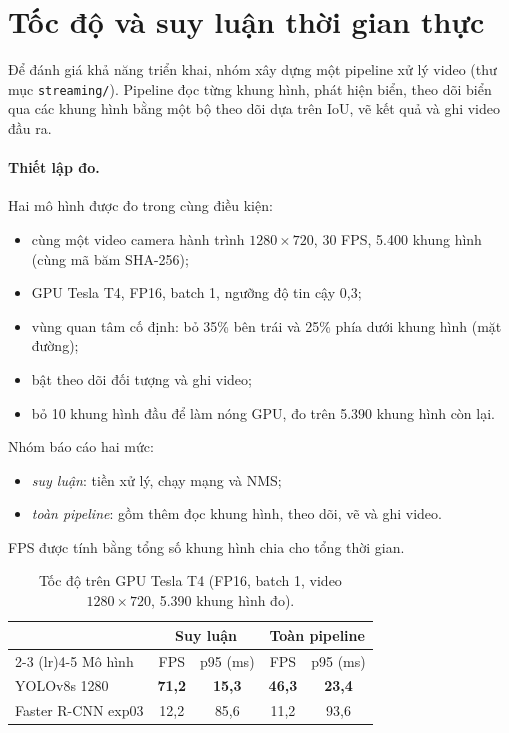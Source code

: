 
\section{Tốc độ và suy luận thời gian thực}
\label{sec:realtime}

Để đánh giá khả năng triển khai, nhóm xây dựng một pipeline xử lý video (thư mục \texttt{streaming/}). Pipeline đọc từng khung hình, phát hiện biển, theo dõi biển qua các khung hình bằng một bộ theo dõi dựa trên IoU, vẽ kết quả và ghi video đầu ra.

\paragraph{Thiết lập đo.}
Hai mô hình được đo trong cùng điều kiện:
\begin{itemize}
\item cùng một video camera hành trình $1280 \times 720$, 30 FPS, 5.400 khung hình (cùng mã băm SHA-256);
\item GPU Tesla T4, FP16, batch 1, ngưỡng độ tin cậy 0,3;
\item vùng quan tâm cố định: bỏ 35\% bên trái và 25\% phía dưới khung hình (mặt đường);
\item bật theo dõi đối tượng và ghi video;
\item bỏ 10 khung hình đầu để làm nóng GPU, đo trên 5.390 khung hình còn lại.
\end{itemize}
Nhóm báo cáo hai mức:
\begin{itemize}
\item \emph{suy luận}: tiền xử lý, chạy mạng và NMS;
\item \emph{toàn pipeline}: gồm thêm đọc khung hình, theo dõi, vẽ và ghi video.
\end{itemize}
FPS được tính bằng tổng số khung hình chia cho tổng thời gian.

\begin{table}[t]
\centering
\small
\begin{tabular}{lcccc}
\toprule
& \multicolumn{2}{c}{Suy luận} & \multicolumn{2}{c}{Toàn pipeline} \\
\cmidrule(lr){2-3} \cmidrule(lr){4-5}
Mô hình & FPS & p95 (ms) & FPS & p95 (ms) \\
\midrule
YOLOv8s 1280         & \textbf{71,2} & \textbf{15,3} & \textbf{46,3} & \textbf{23,4} \\
Faster R-CNN exp03   & 12,2 & 85,6 & 11,2 & 93,6 \\
\bottomrule
\end{tabular}
\caption{Tốc độ trên GPU Tesla T4 (FP16, batch 1, video $1280 \times 720$, 5.390 khung hình đo).}
\label{tab:speed}
\end{table}

